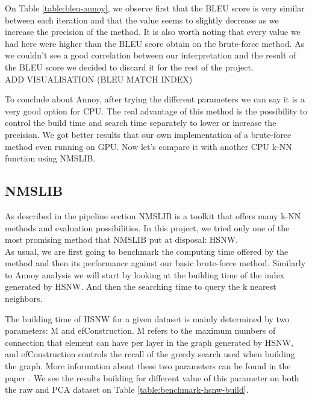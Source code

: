 \documentclass[a4paper]{article}
\begin{document}
On Table \ref{table:bleu-annoy}, we observe first that the BLEU score is very similar between each iteration and that the value seems to slightly decrease as we increase the precision of the method. It is also worth noting that every value we had here were higher than the BLEU score obtain on the brute-force method. As we couldn't see a good correlation between our interpretation and the result of the BLEU score we decided to discard it for the rest of the project. \\


ADD VISUALISATION (BLEU MATCH INDEX)

To conclude about Annoy, after trying the different parameters we can say it is a very good option for CPU. The real advantage of this method is the possibility to control the build time and search time separately to lower or increase the precision. We got better results that our own implementation of a brute-force method even running on GPU. Now let's compare it with another CPU k-NN function using NMSLIB.

	\subsection{NMSLIB}
	
As described in the pipeline section NMSLIB is a toolkit that offers many k-NN methods and evaluation possibilities. In this project, we tried only one of the most promising method that NMSLIB put at disposal: HSNW. \\

As usual, we are first going to benchmark the computing time offered by the method and then its performance against our basic brute-force method. Similarly to Annoy analysis we will start by looking at the building time of the index generated by HSNW. And then the searching time to query the k nearest neighbors.

The building time of HSNW for a given dataset is mainly determined by two parameters: M and efConstruction. M refers to the maximum numbers of connection that element can have per layer in the graph generated by HSNW, and efConstruction controls the recall of the greedy search used when building the graph. More information about these two parameters can be found in the paper \cite{HNSW}. We see the results building for different value of this parameter on both the raw and PCA dataset on Table \ref{table:benchmark-hsnw-build}.
\end{document}

